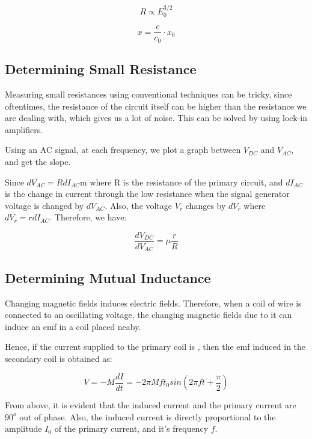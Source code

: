 \documentclass{ieeeconf}
\begin{document}
\[
R \propto E_0^{3/2}
\]

\[
x = \frac{c}{c_0}\cdot x_0
\]

\subsection{Determining Small Resistance}

Measuring small resistances using conventional techniques can be tricky, since oftentimes, the resistance of the circuit itself can be higher than the resistance we are dealing with, which gives us a lot of noise. This can be solved by using lock-in amplifiers.

Using an AC signal, at each frequency, we plot a graph between \(V_{DC}\) and \(V_{AC}\), and get the slope.

Since \(dV_{AC}=RdI_{AC}\)m where R is the resistance of the primary circuit, and \(dI_{AC}\) is the change in current through the low resistance when the signal generator voltage is changed by \(dV_{AC}\). Also, the voltage \(V_r\) changes by \(dV_r\) where \(dV_r=rdI_{AC}\). Therefore, we have:

\[
\frac{dV_{DC}}{dV_{AC}}=\mu \frac{r}{R}
\]

\subsection{Determining Mutual Inductance}

Changing magnetic fields induces electric fields. Therefore, when a coil of wire is connected to an oscillating voltage, the changing magnetic fields due to it can induce an emf in a coil placed neaby.

Hence, if the current supplied to the primary coil is ,
then the emf induced in the secondary coil is obtained as:

\[
V=-M\frac{dI}{dt}= -2\pi Mft_0 sin(2\pi f t+\frac{\pi}{2})
\]

From above, it is evident that the induced current and the primary current are \(90^o\) out of phase. Also, the induced current is directly proportional to the amplitude \(I_0\) of the primary current, and it's frequency \(f\).
\end{document}
